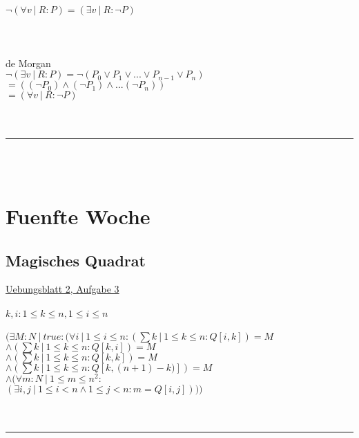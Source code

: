 \documentclass[18pt,a4paper]{article}
\newcommand{\tab}{\hspace*{2em}}
\begin{document}
$\neg (\forall{v} \:\vert\: R : P) = (\exists{v} \:\vert\: R : \neg P)$\\
\\
\\
\\
de Morgan\\
$\neg (\exists{v} \:\vert\: R : P) = \neg (P_0 \vee P_1 \vee ... \vee P_{n-1} \vee P_n) $\\
\tab \tab \tab $= ((\neg P_0) \wedge (\neg P_1) \wedge ... (\neg P_n))$\\
\tab \tab \tab $= (\forall{v} \:\vert\: R : \neg P)$\\
\\
\\
\rule{\textwidth}{0.4mm}\\
\\

\section{Fuenfte Woche}

\subsection{Magisches Quadrat}

\uline{Uebungsblatt 2, Aufgabe 3}\\
\\
$k,i: 1\leqslant k\leqslant n, 1\leqslant i\leqslant n$\\
\\
$(\exists{M} : N \:\vert\: true : (\forall{i} \:\vert\: 1\leqslant i\leqslant n :(\sum{k} \:\vert\: 1\leqslant k\leqslant n : Q[i,k]) = M $\\
\tab\tab\tab\tab\tab\tab\tab $\wedge (\sum{k} \:\vert\: 1\leqslant k\leqslant n : Q[k,i]) = M$ \\
\tab\tab\tab\tab\tab\tab\tab $\wedge (\sum{k} \:\vert\: 1\leqslant k\leqslant n : Q[k,k]) = M$ \\
\tab\tab\tab\tab\tab\tab\tab $\wedge (\sum{k} \:\vert\: 1\leqslant k\leqslant n : Q[k,(n+1)-k)]) = M$\\
\tab\tab\tab\tab\tab\tab\tab $\wedge (\forall{m} : N \:\vert\: 1\leqslant m\leqslant n^2 :$\\
\tab\tab\tab\tab\tab\tab\tab\tab $(\exists{i,j} \:\vert\: 1\leqslant i < n\wedge 1\leqslant j < n: m = Q[i,j])))$ \\
\\
\\
\rule{\textwidth}{0.4mm}\\
\\
\end{document}
